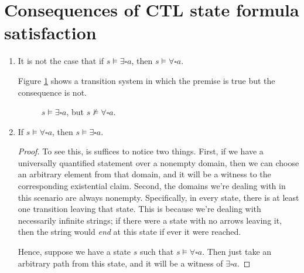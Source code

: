 \documentclass[letterpaper,11pt]{article}
\newcommand{\question}{\section}
\newcommand{\always}{\square}
\newcommand{\nmodels}{\nvDash}
\begin{document}
\question{Consequences of CTL state formula satisfaction}

\begin{enumerate}
    \item It is not the case that
        if $s \models \exists \always a$, then $s \models \forall \always a$.

        Figure \ref{fig:ts-counterexample-2} shows a transition system in which
        the premise is true but the consequence is not.

        \begin{figure}[ht]
            \centering
            \caption{
                $s \models \exists \always a$, but
                $s \nmodels \forall \always a$.
            }
            \label{fig:ts-counterexample-2}
        \end{figure}

    \item If $s \models \forall \always a$, then $s \models \exists \always a$.

        \begin{proof}
            To see this, is suffices to notice two things.
            First, if we have a universally quantified statement over a
            nonempty domain, then we can choose an arbitrary element from that
            domain, and it will be a witness to the corresponding existential
            claim.
            Second, the domains we're dealing with in this scenario are always
            nonempty. Specifically, in every state, there is at least one
            transition leaving that state. This is because we're dealing with
            necessarily infinite strings; if there were a state with no arrows
            leaving it, then the string would \emph{end} at this state if ever
            it were reached.

            Hence, suppose we have a state $s$ such that
            $s \models \forall \always a$. Then just take an arbitrary path
            from this state, and it will be a witness of $\exists \always a$.
        \end{proof}
\end{enumerate}
\end{document}
